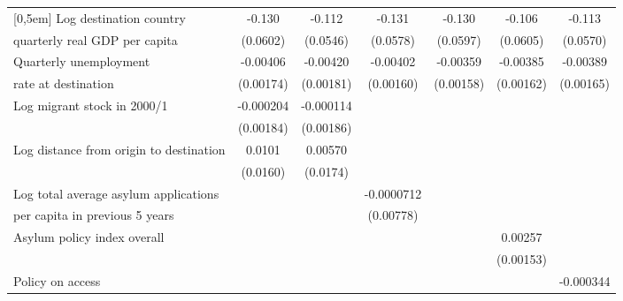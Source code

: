 \begin{table}[!ht]
\begin{tabular}{l*{6}{c}}
[0,5em]
Log destination country &      -0.130\sym{*}  &      -0.112\sym{*}  &      -0.131\sym{*}  &      -0.130\sym{*}  &      -0.106         &      -0.113         \\
quarterly real GDP per capita                    &    (0.0602)         &    (0.0546)         &    (0.0578)         &    (0.0597)         &    (0.0605)         &    (0.0570)         \\
[0,5em]
Quarterly unemployment &    -0.00406\sym{*}  &    -0.00420\sym{*}  &    -0.00402\sym{*}  &    -0.00359\sym{*}  &    -0.00385\sym{*}  &    -0.00389\sym{*}  \\
rate at destination                    &   (0.00174)         &   (0.00181)         &   (0.00160)         &   (0.00158)         &   (0.00162)         &   (0.00165)         \\
[0,5em]
Log migrant stock in 2000/1&   -0.000204         &   -0.000114         &                     &                     &                     &                     \\
                    &   (0.00184)         &   (0.00186)         &                     &                     &                     &                     \\
[0,5em]
Log distance from origin to destination&      0.0101         &     0.00570         &                     &                     &                     &                     \\
                    &    (0.0160)         &    (0.0174)         &                     &                     &                     &                     \\
[0,5em]
Log total average asylum applications &                     &                     &  -0.0000712         &                     &                     &                     \\
per capita in previous 5 years                    &                     &                     &   (0.00778)         &                     &                     &                     \\
[0,5em]
Asylum policy index overall&                     &                     &                     &                     &     0.00257         &                     \\
                    &                     &                     &                     &                     &   (0.00153)         &                     \\
[0,5em]
Policy on access    &                     &                     &                     &                     &                     &   -0.000344         \\

\end{tabular}
\end{table}
